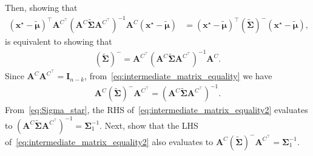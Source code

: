 \documentclass[12pt]{article}
\begin{document}
Then, showing that
\begin{equation}
\begin{split}
    (\bm{x}^{\star} - \tilde{\bm{\mu}})^{\top} \bm{A}^{C^{\top}}(\bm{A}^C \tilde{\bm{\Sigma}} \bm{A}^{C^{\top}})^{-1} \bm{A}^C (\bm{x}^{\star} - \tilde{\bm{\mu}})
    &= 
    (\bm{x}^{\star} - \tilde{\bm{\mu}})^{\top} (\tilde{\bm{\Sigma}})^{-} (\bm{x}^{\star} - \tilde{\bm{\mu}}),
\end{split}
\end{equation}
is equivalent to showing that
\begin{equation} \label{eq:intermediate_matrix_equality}
\begin{split}
    (\tilde{\bm{\Sigma}})^{-} = \bm{A}^{C^{\top}}(\bm{A}^C \tilde{\bm{\Sigma}} \bm{A}^{C^{\top}})^{-1} \bm{A}^C.
\end{split}
\end{equation}
Since $\bm{A}^{C} \bm{A}^{C^{\top}} = \bm{I}_{n-k}$, from~\eqref{eq:intermediate_matrix_equality} we have
\begin{equation} \label{eq:intermediate_matrix_equality2}
\begin{split}
    \bm{A}^C(\tilde{\bm{\Sigma}})^{-}\bm{A}^{C^{\top}} = (\bm{A}^C \tilde{\bm{\Sigma}} \bm{A}^{C^{\top}})^{-1}.
\end{split}
\end{equation}
From~\eqref{eq:Sigma_star}, the RHS of~\eqref{eq:intermediate_matrix_equality2} evaluates to $(\bm{A}^C \tilde{\bm{\Sigma}} \bm{A}^{C^{\top}})^{-1} = \bm{\Sigma}_1^{-1}$. Next, show that the LHS of~\eqref{eq:intermediate_matrix_equality2} also evaluates to $\bm{A}^C(\tilde{\bm{\Sigma}})^{-}\bm{A}^{C^{\top}} = \bm{\Sigma}_1^{-1}$. 
\end{document}
